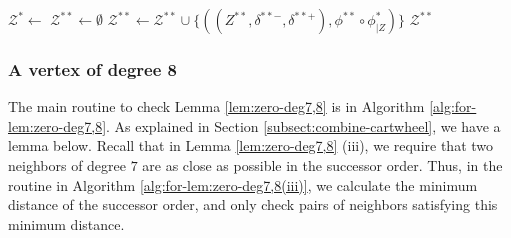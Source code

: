 \documentclass[main.tex]{subfiles}
\begin{document}
\begin{algorithm}[H]
    \caption{\combineEachCartwheelTwiceWithLink($(Z, \delta^-, \delta^+), e_1, e_2, \mathcal{C}, \mathcal{K}$)}
    \label{alg:combine_each_cartwheel_twice}
    \begin{algorithmic}[1]
        \State $\mathcal{Z}^* \gets$ 
        \State $\mathcal{Z}^{**} \gets \emptyset$
                    \State $\mathcal{Z}^{**} \gets \mathcal{Z}^{**} \cup \{((Z^{**}, \delta^{**-}, \delta^{**+}), \phi^{**} \circ \phi^*_{|Z})\}$
                \EndFor
            \EndFor
        \State \Return $\mathcal{Z}^{**}$
    \end{algorithmic}
\end{algorithm}


\subsubsection{A vertex of degree 8}
The main routine to check Lemma \ref{lem:zero-deg7,8} is \checkDegE in Algorithm \ref{alg:for-lem:zero-deg7,8}. As explained in Section \ref{subsect:combine-cartwheel}, we have a lemma below.
Recall that in Lemma \ref{lem:zero-deg7,8} (iii), we require that two neighbors of degree $7$ are as close as possible in the successor order.
Thus, in the \checkSES routine in Algorithm \ref{alg:for-lem:zero-deg7,8(iii)}, we calculate the minimum distance of the successor order, and only check pairs of neighbors satisfying this minimum distance.
\end{document}
